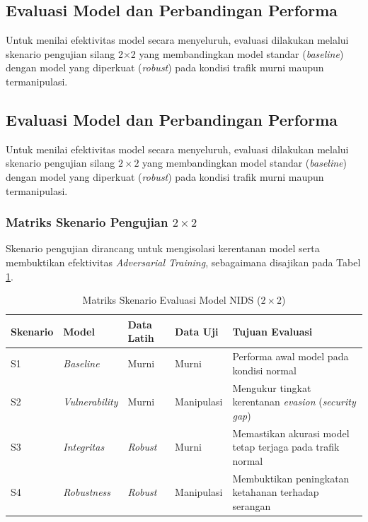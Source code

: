 \documentclass[11pt, a4paper]{article}
\begin{document}
\subsection{Evaluasi Model dan Perbandingan Performa}
Untuk menilai efektivitas model secara menyeluruh, evaluasi dilakukan melalui skenario pengujian silang 2$\times$2 yang membandingkan model standar (\textit{baseline}) dengan model yang diperkuat (\textit{robust}) pada kondisi trafik murni maupun termanipulasi.

\subsection{Evaluasi Model dan Perbandingan Performa}
Untuk menilai efektivitas model secara menyeluruh, evaluasi dilakukan melalui skenario pengujian silang $2\times 2$ yang membandingkan model standar (\textit{baseline}) dengan model yang diperkuat (\textit{robust}) pada kondisi trafik murni maupun termanipulasi.

\subsubsection{Matriks Skenario Pengujian $2\times 2$}
Skenario pengujian dirancang untuk mengisolasi kerentanan model serta membuktikan efektivitas \textit{Adversarial Training}, sebagaimana disajikan pada Tabel \ref{tab:skenario_pengujian_2x2}.

\begin{table}[t]
\caption{Matriks Skenario Evaluasi Model NIDS ($2\times 2$)}
\label{tab:skenario_pengujian_2x2}
\centering
\vspace{0.2cm}
\small
\begin{tabular}{@{} p{} p{} p{} p{} p{} @{}}
\toprule
\textbf{Skenario} & \textbf{Model} & \textbf{Data Latih} & \textbf{Data Uji} & \textbf{Tujuan Evaluasi} \\ \midrule
S1 & \textit{Baseline} & Murni & Murni & Performa awal model pada kondisi normal \\ \addlinespace
S2 & \textit{Vulnerability} & Murni & Manipulasi & Mengukur tingkat kerentanan \textit{evasion} (\textit{security gap}) \\ \addlinespace
S3 & \textit{Integritas} & \textit{Robust} & Murni & Memastikan akurasi model tetap terjaga pada trafik normal \\ \addlinespace
S4 & \textit{Robustness} & \textit{Robust} & Manipulasi & Membuktikan peningkatan ketahanan terhadap serangan \\ \bottomrule
\end{tabular}
\end{table}
\end{document}

